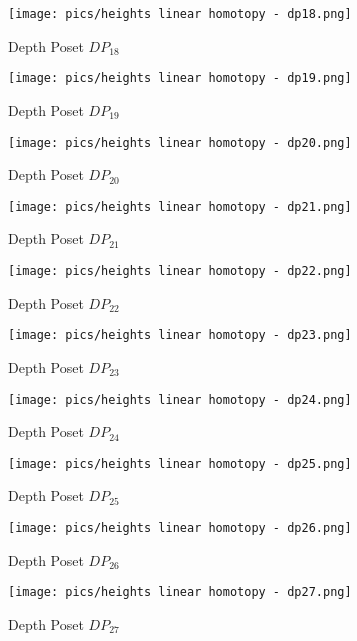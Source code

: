 \documentclass{article}
\begin{document}
\begin{figure}[h]
    \centering
    \texttt{[image: pics/heights linear homotopy - dp18.png]}
    \caption{Depth Poset $DP_{18}$}
    \label{fig:dp18}
\end{figure}
\begin{figure}[h]
    \centering
    \texttt{[image: pics/heights linear homotopy - dp19.png]}
    \caption{Depth Poset $DP_{19}$}
    \label{fig:dp19}
\end{figure}
\begin{figure}[h]
    \centering
    \texttt{[image: pics/heights linear homotopy - dp20.png]}
    \caption{Depth Poset $DP_{20}$}
    \label{fig:dp20}
\end{figure}
\begin{figure}[h]
    \centering
    \texttt{[image: pics/heights linear homotopy - dp21.png]}
    \caption{Depth Poset $DP_{21}$}
    \label{fig:dp21}
\end{figure}
\begin{figure}[h]
    \centering
    \texttt{[image: pics/heights linear homotopy - dp22.png]}
    \caption{Depth Poset $DP_{22}$}
    \label{fig:dp22}
\end{figure}
\begin{figure}[h]
    \centering
    \texttt{[image: pics/heights linear homotopy - dp23.png]}
    \caption{Depth Poset $DP_{23}$}
    \label{fig:dp23}
\end{figure}
\begin{figure}[h]
    \centering
    \texttt{[image: pics/heights linear homotopy - dp24.png]}
    \caption{Depth Poset $DP_{24}$}
    \label{fig:dp24}
\end{figure}
\begin{figure}[h]
    \centering
    \texttt{[image: pics/heights linear homotopy - dp25.png]}
    \caption{Depth Poset $DP_{25}$}
    \label{fig:dp25}
\end{figure}
\begin{figure}[h]
    \centering
    \texttt{[image: pics/heights linear homotopy - dp26.png]}
    \caption{Depth Poset $DP_{26}$}
    \label{fig:dp26}
\end{figure}
\begin{figure}[h]
    \centering
    \texttt{[image: pics/heights linear homotopy - dp27.png]}
    \caption{Depth Poset $DP_{27}$}
    \label{fig:dp27}
\end{figure}
\end{document}
